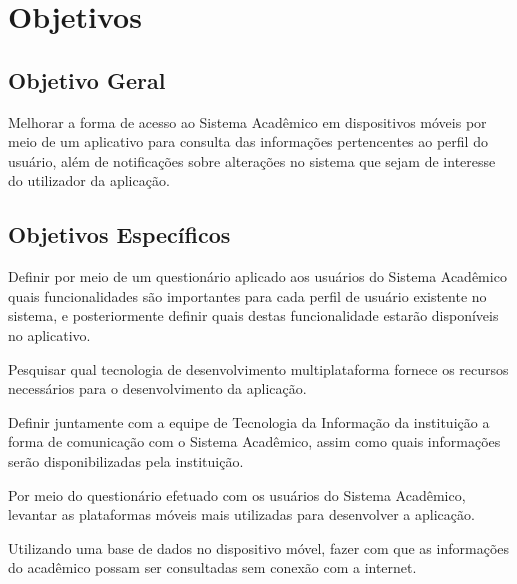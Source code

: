 \section{Objetivos}
\subsection{Objetivo Geral}
Melhorar a forma de acesso ao Sistema Acadêmico em dispositivos móveis por meio de um aplicativo para consulta das informações pertencentes ao perfil do usuário, além de notificações sobre alterações no sistema que sejam de interesse do utilizador da aplicação.

\subsection{Objetivos Específicos}
Definir por meio de um questionário aplicado aos usuários do Sistema Acadêmico quais funcionalidades são importantes para cada perfil de usuário existente no sistema, e posteriormente definir quais destas funcionalidade estarão disponíveis no aplicativo.

Pesquisar qual tecnologia de desenvolvimento multiplataforma fornece os recursos necessários para o desenvolvimento da aplicação.

Definir juntamente com a equipe de Tecnologia da Informação da instituição a forma de comunicação com o Sistema Acadêmico, assim como quais informações serão disponibilizadas pela instituição. 

Por meio do questionário efetuado com os usuários do Sistema Acadêmico, levantar as plataformas móveis mais utilizadas para desenvolver a aplicação.

Utilizando uma base de dados no dispositivo móvel, fazer com que as informações do acadêmico possam ser consultadas sem conexão com a internet.